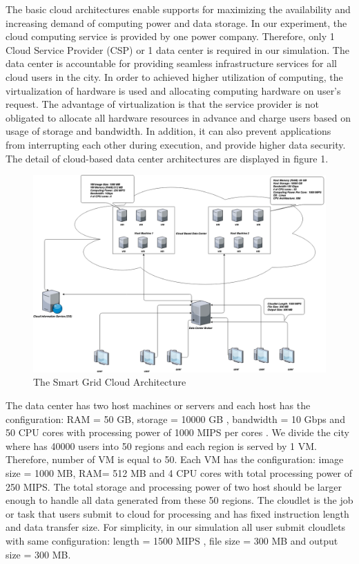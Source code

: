 \documentclass[12pt]{article}
\begin{document}
The basic cloud architectures enable supports for maximizing the availability and increasing demand of computing power and data storage\cite{ok2}. In our experiment, the cloud computing service is provided by one power company. Therefore, only 1 Cloud Service Provider (CSP) or 1 data center is required in our simulation. The data center is accountable for providing seamless infrastructure services for all cloud users in the city. In order to achieved higher utilization of computing, the virtualization of hardware is used and allocating computing hardware on user's request. The advantage of virtualization is that the service provider is not obligated to allocate all  hardware resources in advance and charge users based on usage of storage and bandwidth. In addition, it can also prevent applications from interrupting each other during execution, and provide higher data security. The detail of cloud-based data center architectures are displayed in figure 1.

\begin{figure}[ht!]
\centering
\includegraphics[scale=0.2]{smart_grid_cloud.png}
\caption{The Smart Grid Cloud Architecture}
\end{figure}

\indent The data center has two host machines or servers and each host has the configuration: RAM = 50 GB,  storage  = 10000 GB , bandwidth = 10 Gbps and  50 CPU cores with processing power of 1000 MIPS per cores .  We divide the city where has 40000 users into 50 regions and each region is served by 1 VM.  Therefore, number of VM is equal to 50.  Each VM has the configuration: image size = 1000 MB, RAM= 512 MB and 4 CPU cores with total processing power of 250 MIPS. The total storage and processing power of two host should be larger enough to handle all data  generated from these 50 regions.  The cloudlet is the  job or task that users submit to cloud for processing and has fixed instruction length and data transfer size. For simplicity, in our simulation all user submit cloudlets with same configuration: length = 1500 MIPS , file size = 300 MB and output size = 300 MB. 


\newpage


\end{document}
